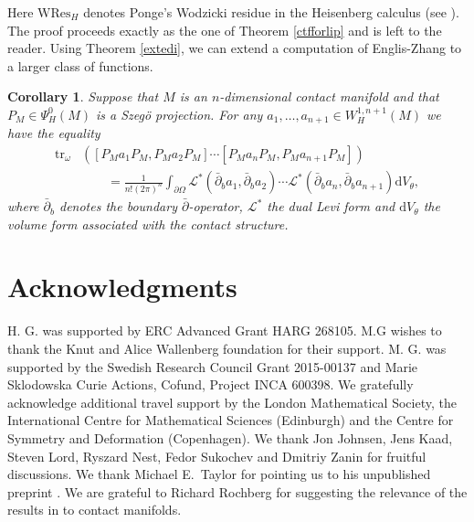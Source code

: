 \documentclass[10pt]{amsart}
\newtheorem{cor}[thm]{Corollary}
\theoremstyle{remark}
\theoremstyle{definition}
\begin{document}
Here $\mathrm{WRes}_H$ denotes Ponge's Wodzicki residue in the Heisenberg calculus (see \cite{pongeresidue}). The proof proceeds exactly as the one  of Theorem \ref{ctfforlip} and is left to the reader. Using Theorem \ref{extedi}, we can extend a computation of Englis-Zhang \cite{engzh} to a larger class of functions. 

\begin{cor}
\label{engszhangcor}
Suppose that $M$ is an $n$-dimensional contact manifold and that $P_M\in \Psi^0_H(M)$ is a Szeg\"o projection. For any $a_1,\ldots, a_{n+1}\in W^{1,n+1}_H(M)$ we have the equality
\begin{align*}
{\mathrm{t}\mathrm{r}}_\omega&\left([P_Ma_1P_M,P_Ma_2P_M]\cdots [P_Ma_{n}P_M,P_Ma_{n+1}P_M]\right)\\
&\qquad=\frac{1}{n!(2\pi)^n} \int_{\partial \Omega} \mathcal{L}^*(\bar{\partial}_ba_1,\bar{\partial}_ba_2)\cdots \mathcal{L}^*(\bar{\partial}_ba_{n},\bar{\partial}_ba_{n+1}) {\mathrm{d}} V_\theta,
\end{align*}
where $\bar{\partial}_b$ denotes the boundary $\bar{\partial}$-operator, $\mathcal{L}^*$ the dual Levi form and ${\mathrm{d}} V_\theta$ the volume form associated with the contact structure. 
\end{cor}

\section*{{\bf Acknowledgments}}

H. G. was supported by ERC Advanced Grant HARG 268105. M.G wishes to thank the Knut and Alice Wallenberg foundation for their support. M. G. was supported by the Swedish Research Council Grant 2015-00137 and Marie Sklodowska Curie Actions, Cofund, Project INCA 600398. We gratefully acknowledge additional travel support by the London Mathematical Society, the International Centre for Mathematical Sciences (Edinburgh) and the Centre for Symmetry and Deformation (Copenhagen). We thank Jon Johnsen, Jens Kaad, Steven Lord, Ryszard Nest, Fedor Sukochev and Dmitriy Zanin for fruitful discussions. We thank Michael E.~Taylor for pointing us to his unpublished preprint \cite{hbcom}. We are grateful to Richard Rochberg for suggesting the relevance of the results in \cite{rochbergsemmes} to contact manifolds.
\end{document}
